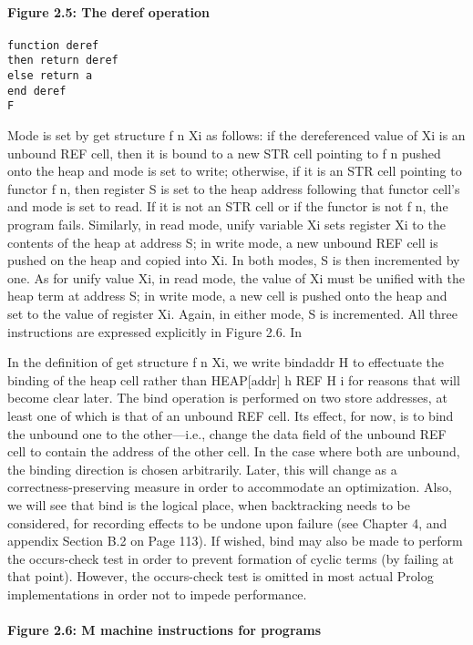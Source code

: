 \paragraph{Figure 2.5: The deref operation}
\begin{verbatim}
function deref 
then return deref
else return a
end deref 
F
\end{verbatim}

Mode is set by get structure f n
Xi as follows: if the dereferenced value
of Xi is an unbound REF cell, then it is bound to a new STR cell pointing to f n
pushed onto the heap and mode is set to write; otherwise, if it is an STR cell
pointing to functor f n, then register S is set to the heap address following that
functor cell’s and mode is set to read. If it is not an STR cell or if the functor
is not f n, the program fails. Similarly, in read mode, unify variable Xi
sets register Xi to the contents of the heap at address S; in write mode, a new
unbound REF cell is pushed on the heap and copied into Xi. In both modes, S is
then incremented by one. As for unify value Xi, in read mode, the value of
Xi must be unified with the heap term at address S; in write mode, a new cell is
pushed onto the heap and set to the value of register Xi. Again, in either mode, S
is incremented. All three instructions are expressed explicitly in Figure 2.6.
In

In the definition of get structure f n
Xi, we write bindaddr
H to effectuate
the binding of the heap cell rather than HEAP[addr]  h REF
H i for reasons
that will become clear later. The bind operation is performed on two store
addresses, at least one of which is that of an unbound REF cell. Its effect, for
now, is to bind the unbound one to the other—i.e., change the data field of the
unbound REF cell to contain the address of the other cell. In the case where both
are unbound, the binding direction is chosen arbitrarily. Later, this will change
as a correctness-preserving measure in order to accommodate an optimization.
Also, we will see that bind is the logical place, when backtracking needs to be
considered, for recording effects to be undone upon failure (see Chapter 4, and
appendix Section B.2 on Page 113). If wished, bind may also be made to perform
the occurs-check test in order to prevent formation of cyclic terms (by failing at
that point). However, the occurs-check test is omitted in most actual Prolog implementations
in order not to impede performance.

\paragraph{Figure 2.6: M machine instructions for programs}
\begin{verbatim}

\end{verbatim}

